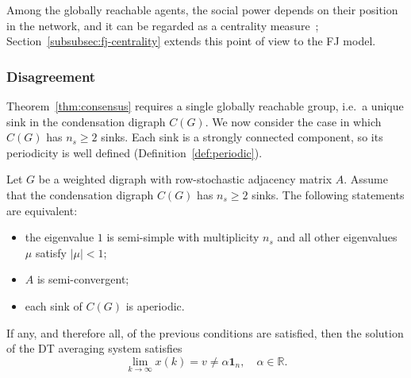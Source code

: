 Among the globally reachable agents, the social power depends on their position in the
network, and it can be regarded as a centrality measure~\cite{proskurnikov2017tutorial};
Section~\ref{subsubsec:fj-centrality} extends this point of view to the FJ model.


\subsubsection{Disagreement}
\label{subsubsec:disagreement}

Theorem~\ref{thm:consensus} requires a single globally reachable group, i.e.\ a
unique sink in the condensation digraph $C(G)$. We now consider the case in which
$C(G)$ has $n_s \geq 2$ sinks. Each sink is a strongly connected component, so its
periodicity is well defined (Definition~\ref{def:periodic}).

\begin{theorem}
\label{thm:disagreement}
Let $G$ be a weighted digraph with row-stochastic adjacency matrix $A$. Assume that
the condensation digraph $C(G)$ has $n_s \geq 2$ sinks. The following statements are
equivalent:
\begin{itemize}
  \item[(A1)] the eigenvalue $1$ is semi-simple with multiplicity $n_s$ and all other
              eigenvalues $\mu$ satisfy $|\mu| < 1$;
  \item[(A2)] $A$ is semi-convergent;
  \item[(A3)] each sink of $C(G)$ is aperiodic.
\end{itemize}
If any, and therefore all, of the previous conditions are satisfied, then the solution
of the DT averaging system satisfies
\[
  \lim_{k \to \infty} x(k) = v \neq \alpha \mathbf{1}_n, \quad \alpha \in \mathbb{R}.
\]
\end{theorem}

